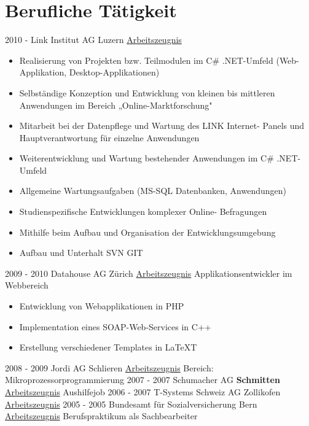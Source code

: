 \documentclass[letterpaper]{twentysecondcv} %
\begin{document}
\makeprofile %
\section{Berufliche Tätigkeit}
\begin{twenty}
	\twentyitem
    	{2010 -}
        {}
        {Link Institut AG \textnormal{Luzern}}
        {\hyperref[sec:hello]{Arbeitszeugnis}}
        {}
        {\begin{itemize}
\item Realisierung von Projekten bzw. Teilmodulen im C\# .NET-Umfeld
(Web-Applikation, Desktop-Applikationen)
\item Selbständige Konzeption und Entwicklung von kleinen bis
mittleren Anwendungen im Bereich „Online-Marktforschung"
\item Mitarbeit bei der Datenpflege und Wartung des LINK Internet-
Panels und Hauptverantwortung für einzelne Anwendungen
\item Weiterentwicklung und Wartung bestehender Anwendungen im
C\# .NET-Umfeld
\item Allgemeine Wartungsaufgaben (MS-SQL Datenbanken,
Anwendungen)
\item Studienspezifische Entwicklungen komplexer Online-
Befragungen
\item Mithilfe beim Aufbau und Organisation der
Entwicklungsumgebung
\item Aufbau und Unterhalt SVN \/ GIT
	\end{itemize}}
	\twentyitem
    	{}
        {}
        {}
        {}
        {}
        {}
	\twentyitem
    	{2009 - 2010}
        {}
        {Datahouse AG \textnormal{Zürich}}
        {\hyperref[sec:hello]{Arbeitszeugnis}}
        {Applikationsentwickler im Webbereich}
        {
		\begin{itemize}
		\item Entwicklung von Webapplikationen in PHP
		\item Implementation eines SOAP-Web-Services in C++
		\item Erstellung verschiedener Templates in LaTeXT
		\end{itemize}
	}	
	\twentyitem
    	{}
        {}
        {}
        {}
        {}
        {}
	\twentyitem
    	{2008 - 2009}
        {}
        {Jordi AG \textnormal{Schlieren}}
        {\hyperref[sec:hello]{Arbeitszeugnis}}
        {Bereich: Mikroprozessorprogrammierung}
        {}
	\twentyitem
    	{2007 - 2007}
        {}
        {Schumacher AG \textbf{Schmitten}}
        {\hyperref[sec:hello]{Arbeitszeugnis}}
        {Aushilfejob}
        {}
	\twentyitem
    	{2006 - 2007}
        {}
        {T-Systems Schweiz AG \textnormal{Zollikofen}}
        {\hyperref[sec:hello]{Arbeitszeugnis}}
        {}
        {}
	\twentyitem
    	{2005 - 2005}
        {}
        {Bundesamt für Sozialversicherung \textnormal{Bern}}
        {\hyperref[sec:hello]{Arbeitszeugnis}}
        {Berufspraktikum als Sachbearbeiter}
        {}


\end{twenty}
\end{document}
